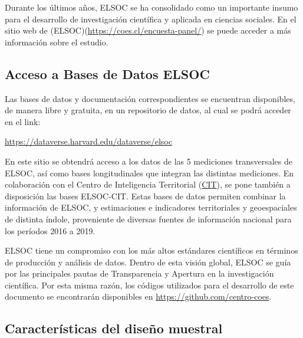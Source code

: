 \documentclass[
  12pt,
]{book}
\begin{document}
Durante los últimos años, ELSOC se ha consolidado como un importante insumo para el desarrollo de investigación científica y aplicada en ciencias sociales. En el sitio web de (ELSOC)(\url{https://coes.cl/encuesta-panel/}) se puede acceder a más información sobre el estudio.

\hypertarget{acceso-a-bases-de-datos-elsoc}{%
\subsection*{Acceso a Bases de Datos ELSOC}\label{acceso-a-bases-de-datos-elsoc}}

Las bases de datos y documentación correspondientes se encuentran disponibles, de manera libre y gratuita, en un repositorio de datos, al cual se podrá acceder en el link:

\url{https://dataverse.harvard.edu/dataverse/elsoc}

En este sitio se obtendrá acceso a los datos de las 5 mediciones transversales de ELSOC, así como bases longitudinales que integran las distintas mediciones. En colaboración con el Centro de Inteligencia Territorial (\href{https://cit.uai.cl/}{CIT}), se pone también a disposición las bases ELSOC-CIT. Estas bases de datos permiten combinar la información de ELSOC, y estimaciones e indicadores territoriales y geoespaciales de distinta índole, proveniente de diversas fuentes de información nacional para los períodos 2016 a 2019.

ELSOC tiene un compromiso con los más altos estándares científicos en términos de producción y análisis de datos. Dentro de esta visión global, ELSOC se guía por las principales pautas de Transparencia y Apertura en la investigación científica. Por esta misma razón, los códigos utilizados para el desarrollo de este documento se encontrarán disponibles en \url{https://github.com/centro-coes}.

\hypertarget{caracteruxedsticas-del-diseuxf1o-muestral}{%
\subsection*{Características del diseño muestral}\label{caracteruxedsticas-del-diseuxf1o-muestral}}
\end{document}
